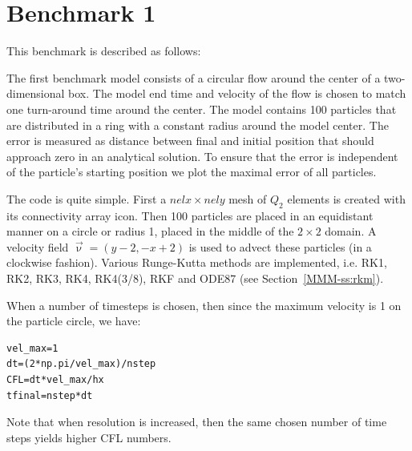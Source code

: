\section*{Benchmark 1}

This benchmark is described as follows:
\begin{displayquote}
{\color{darkgray}
The first benchmark model consists of a circular flow
around the center of a two-dimensional box. The model
end time and velocity of the flow is chosen to match one
turn-around time around the center. The model contains
100 particles that are distributed in a ring with a constant
radius around the model center. The error is measured as
distance between final and initial position that should approach 
zero in an analytical solution. To ensure that the
error is independent of the particle’s starting position we
plot the maximal error of all particles.}
\end{displayquote}

The code is quite simple. First a $nelx \times nely$ mesh of $Q_2$ elements
is created with its connectivity array {\python icon}.
Then 100 particles are placed in an equidistant manner on a circle or radius 1, placed in
the middle of the $2\times 2$ domain. A velocity field $\vec\upnu=(y-2,-x+2)$ is used to 
advect these particles (in a clockwise fashion). 
Various Runge-Kutta methods are implemented, i.e. RK1, RK2, RK3, RK4, RK4(3/8), RKF and ODE87 
(see Section~\ref{MMM-ss:rkm}).

When a number of timesteps is chosen, then since the maximum velocity is 1 on the particle circle, 
we have:
\begin{lstlisting}
vel_max=1
dt=(2*np.pi/vel_max)/nstep
CFL=dt*vel_max/hx
tfinal=nstep*dt
\end{lstlisting}
Note that when resolution is increased, then the same chosen number of time steps 
yields higher CFL numbers. 


